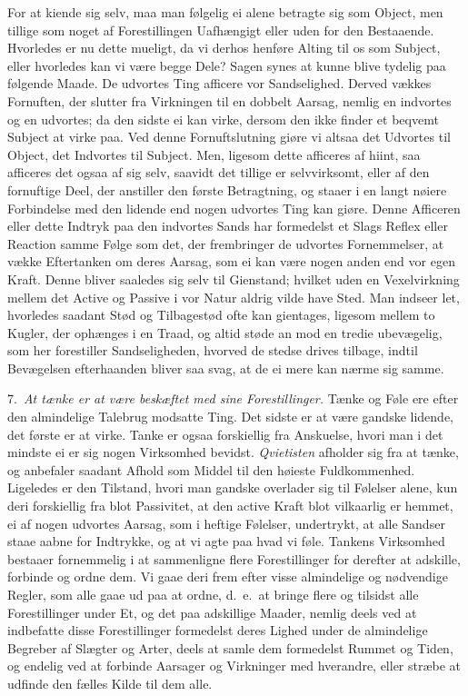 \documentclass[12pt,a4paper]{article}
\newcommand{\opage}[1]{\marginnote{\footnotesize\textit{[#1]}}}
\begin{document}
For at kiende sig selv, maa man følgelig ei alene betragte sig som Object, men
tillige som noget af Forestillingen Uafhængigt eller uden for den Bestaaende.
Hvorledes er nu dette mueligt, da vi derhos henføre Alting til os som Subject,
eller hvorledes kan vi være begge Dele? Sagen synes at kunne blive tydelig paa
følgende Maade. De udvortes Ting afficere vor Sandselighed. Derved vækkes
Fornuften, der slutter fra Virkningen til en dobbelt Aarsag, nemlig en indvortes
og en udvortes; da den sidste ei kan virke, dersom den ikke finder et beqvemt
Subject at virke paa. Ved denne Fornuftslutning giøre vi altsaa det Udvortes til
Object, det Indvortes til Subject. Men, ligesom dette afficeres af hiint, saa
afficeres det ogsaa af sig selv, saavidt det tillige er selvvirksomt, eller af den
fornuftige Deel,
\opage{45} der anstiller den første Betragtning, og staaer i en langt nøiere Forbindelse med
den lidende end nogen udvortes Ting kan giøre. Denne Afficeren eller dette Indtryk
paa den indvortes Sands har formedelst et Slags Reflex eller Reaction samme Følge
som det, der frembringer de udvortes Fornemmelser, at vække Eftertanken om deres
Aarsag, som ei kan være nogen anden end vor egen Kraft. Denne bliver saaledes sig
selv til Gienstand; hvilket uden en Vexelvirkning mellem det Active og Passive i vor
Natur aldrig vilde have Sted. Man indseer let, hvorledes saadant Stød og Tilbagestød
ofte kan gientages, ligesom mellem to Kugler, der ophænges i en Traad, og altid støde
an mod en tredie ubevægelig, som her forestiller Sandseligheden, hvorved de stedse
drives tilbage, indtil Bevægelsen efterhaanden bliver saa svag, at de ei mere kan
nærme sig samme.

7.~\emph{At tænke er at være beskæftet med sine Forestillinger.} Tænke og Føle ere
efter den almindelige Talebrug modsatte Ting. Det sidste er at være gandske lidende,
det første er at virke. Tanke er ogsaa forskiellig fra Anskuelse, hvori man i det
mindste ei er sig nogen Virksomhed bevidst. \emph{Qvietisten} afholder sig fra at
tænke, og anbefaler saadant Afhold som Middel til den høieste Fuldkommenhed.
Ligeledes er den Tilstand, hvori man gandske overlader sig til Følelser alene, kun
deri forskiellig fra blot Passivitet, at den active Kraft blot vilkaarlig er hemmet,
ei af nogen udvortes Aarsag,
\opage{46} som i heftige Følelser, undertrykt, at alle Sandser staae aabne for Indtrykke, og at
vi agte paa hvad vi føle. Tankens Virksomhed bestaaer fornemmelig i at sammenligne
flere Forestillinger for derefter at adskille, forbinde og ordne dem. Vi gaae deri
frem efter visse almindelige og nødvendige Regler, som alle gaae ud paa at ordne,
d.~e.\ at bringe flere og tilsidst alle Forestillinger under Et, og det paa adskillige
Maader, nemlig deels ved at indbefatte disse Forestillinger formedelst deres Lighed
under de almindelige Begreber af Slægter og Arter, deels at samle dem formedelst
Rummet og Tiden, og endelig ved at forbinde Aarsager og Virkninger med hverandre,
eller stræbe at udfinde den fælles Kilde til dem alle.
\end{document}

